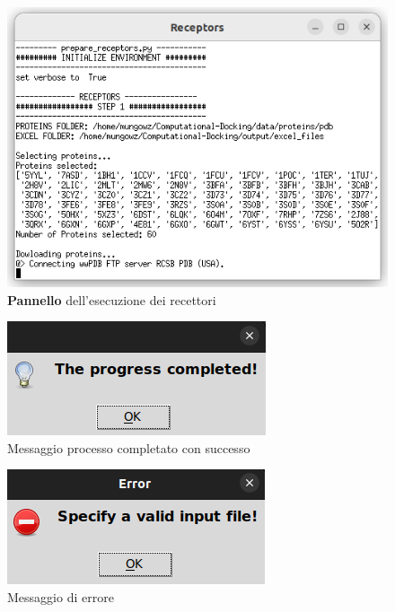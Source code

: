 \begin{figure}[H]
    \centering
    \includegraphics[scale=0.8]{immagini/receptorsExecution.png}
    \caption{\textbf{Pannello} dell'esecuzione dei recettori}
    \label{fig:receptors execute}
\end{figure}

\begin{figure}[H]
    \centering
    \includegraphics{immagini/progressCompletedReceptors.png}
    \caption{Messaggio processo completato con successo}
    \label{fig:progress completed proteins}
\end{figure}

\begin{figure}[H]
    \centering
    \includegraphics{immagini/invalidInputReceptors.png}
    \caption{Messaggio di errore}
    \label{fig:Invalid input proteins}
\end{figure}

